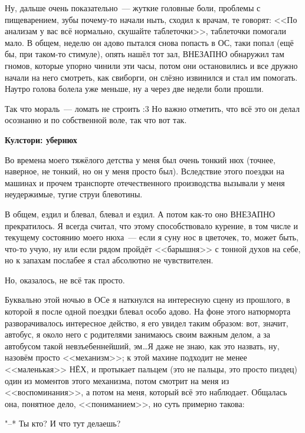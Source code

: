 \documentclass[a4paper,14pt,oneside]{memoir}
\begin{document}
Ну, дальше очень показательно~--- жуткие головные боли, проблемы с пищеварением, зубы почему-то начали ныть, сходил к врачам, те говорят: <<По анализам у вас всё нормально, скушайте таблеточки>>, таблеточки помогали мало. В общем, неделю он адово пытался снова попасть в ОС, таки попал (ещё бы, при таком-то стимуле), опять нашёл тот зал, ВНЕЗАПНО обнаружил там гномов, которые упорно чинили эти часы, потом они остановились и все дружно начали на него смотреть, как свиборги, он слёзно извинился и стал им помогать. Наутро голова болела уже меньше, ну а через две недели боли прошли.

Так что мораль~--- ломать не строить :3 Но важно отметить, что всё это он делал осознанно и по собственной воле, так что вот так.

\begin{shaded}

\begin{center}
\Large\textbf{Кулстори: убернюх}
\end{center}


Во времена моего тяжёлого детства у меня был очень тонкий нюх (точнее, наверное, не тонкий, но он у меня просто был). Вследствие этого поездки на машинах и прочем транспорте отечественного производства вызывали у меня неудержимые, тугие струи блевотины.

В общем, ездил и блевал, блевал и ездил. А потом как-то оно ВНЕЗАПНО прекратилось. Я всегда считал, что этому способствовало курение, в том числе и текущему состоянию моего нюха~--- если я суну нос в цветочек, то, может быть, что-то учую, ну или если рядом пройдёт <<барышня>> с тонной духов на себе, но к запахам послабее я стал абсолютно не чувствителен.

Но, оказалось, не всё так просто.

Буквально этой ночью в ОСе я наткнулся на интересную сцену из прошлого, в которой я после одной поездки блевал особо адово. На фоне этого натюрморта разворачивалось интересное действо, я его увидел таким образом: вот, значит, автобус, я около него с родителями занимаюсь своим важным делом, а за автобусом такой невзъебеннейший, эм\ldots Я даже не знаю, как это назвать, ну, назовём просто <<механизм>>; к этой махине подходит не менее <<маленькая>> НЁХ, и протыкает пальцем (это не пальцы, это просто пиздец) один из моментов этого механизма, потом смотрит на меня из <<воспоминания>>, а потом на меня, который всё это наблюдает. Общалась она, понятное дело, <<пониманием>>, но суть примерно такова:

"--* Ты кто? И что тут делаешь?


\end{shaded}
\end{document}
